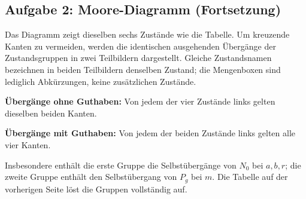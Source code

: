 \subsection*{Aufgabe 2: Moore-Diagramm (Fortsetzung)}
Das Diagramm zeigt dieselben sechs Zustände wie die Tabelle. Um kreuzende Kanten zu vermeiden, werden die identischen ausgehenden Übergänge der Zustandsgruppen in zwei Teilbildern dargestellt. Gleiche Zustandsnamen bezeichnen in beiden Teilbildern denselben Zustand; die Mengenboxen sind lediglich Abkürzungen, keine zusätzlichen Zustände.

\textbf{Übergänge ohne Guthaben:} Von jedem der vier Zustände links gelten dieselben beiden Kanten.
\begin{center}
\end{center}

\textbf{Übergänge mit Guthaben:} Von jedem der beiden Zustände links gelten alle vier Kanten.
\begin{center}
\end{center}
Insbesondere enthält die erste Gruppe die Selbstübergänge von $N_0$ bei $a,b,r$; die zweite Gruppe enthält den Selbstübergang von $P_g$ bei $m$. Die Tabelle auf der vorherigen Seite löst die Gruppen vollständig auf.
\newpage
